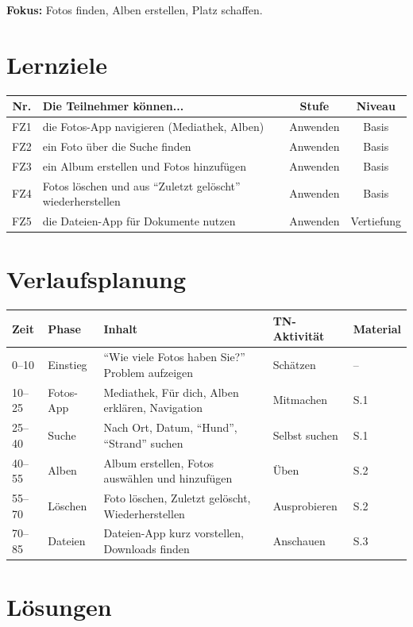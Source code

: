\documentclass[11pt,a4paper]{article}
\begin{document}
\textbf{Fokus:} Fotos finden, Alben erstellen, Platz schaffen.

\section{Lernziele}

\begin{tabular}{|c|p{7cm}|c|c|}
\hline
\textbf{Nr.} & \textbf{Die Teilnehmer können...} & \textbf{Stufe} & \textbf{Niveau} \\
\hline
FZ1 & die Fotos-App navigieren (Mediathek, Alben) & Anwenden & Basis \\
FZ2 & ein Foto über die Suche finden & Anwenden & Basis \\
FZ3 & ein Album erstellen und Fotos hinzufügen & Anwenden & Basis \\
FZ4 & Fotos löschen und aus ``Zuletzt gelöscht'' wiederherstellen & Anwenden & Basis \\
FZ5 & die Dateien-App für Dokumente nutzen & Anwenden & Vertiefung \\
\hline
\end{tabular}

\section{Verlaufsplanung}

\begin{longtable}{|p{1cm}|p{2cm}|p{5cm}|p{3cm}|p{2cm}|}
\hline
\textbf{Zeit} & \textbf{Phase} & \textbf{Inhalt} & \textbf{TN-Aktivität} & \textbf{Material} \\
\hline
0--10 & Einstieg & ``Wie viele Fotos haben Sie?'' Problem aufzeigen & Schätzen & -- \\
\hline
10--25 & Fotos-App & Mediathek, Für dich, Alben erklären, Navigation & Mitmachen & S.1 \\
\hline
25--40 & Suche & Nach Ort, Datum, ``Hund'', ``Strand'' suchen & Selbst suchen & S.1 \\
\hline
40--55 & Alben & Album erstellen, Fotos auswählen und hinzufügen & Üben & S.2 \\
\hline
55--70 & Löschen & Foto löschen, Zuletzt gelöscht, Wiederherstellen & Ausprobieren & S.2 \\
\hline
70--85 & Dateien & Dateien-App kurz vorstellen, Downloads finden & Anschauen & S.3 \\
\hline
\end{longtable}

\section{Lösungen}
\end{document}
